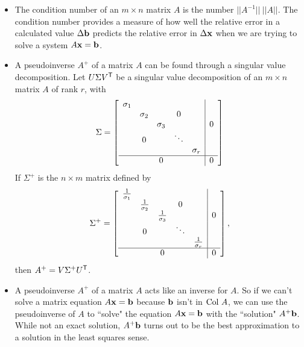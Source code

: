 \label{sec:pseudo_summ}
\begin{itemize}
\item The condition number of an $m \times n$ matrix $A$ is the number $||A^{-1}|| \ ||A||$. The condition number provides a measure of how well the relative error in a calculated value $\Delta \mathbf{b}$ predicts the relative error in $\Delta \mathbf{x}$ when we are trying to solve a system $A \mathbf{x} = \mathbf{b}$.  
\item A pseudoinverse $A^{+}$ of a matrix $A$ can be found through a singular value decomposition. Let $U \Sigma V^{\mathsf{T}}$ be a singular value decomposition of an $m \times n$ matrix $A$ of rank $r$, with
\[\Sigma = \left[ \begin{array}{ccccc|c} \sigma_1&&&&& \\ & \sigma_2&&0&& \\ && \sigma_3&&&0 \\ & 0 & & \ddots & & \\ &&&& \sigma_r \\ \hline &&0&&&0 \end{array} \right] \]
If $\Sigma^+$ is the $n \times m$ matrix defined by
\[\Sigma^{+} = \left[ \begin{array}{ccccc|c} \frac{1}{\sigma_1}&&&&& \\ & \frac{1}{\sigma_2}&&0&& \\ && \frac{1}{\sigma_3}&&&0 \\ & 0 & & \ddots & & \\ &&&& \frac{1}{\sigma_r} \\ \hline &&0&&&0 \end{array} \right],\]
then $A^{+} = V\Sigma^{+}U^{\mathsf{T}}$. 
\item A pseudoinverse $A^{+}$ of a matrix $A$ acts like an inverse for $A$. So if we can't solve a matrix equation $A \mathbf{x} = \mathbf{b}$ because $\mathbf{b}$ isn't in $\text{Col } A$, we can use the pseudoinverse of $A$ to ``solve" the equation $A \mathbf{x} = \mathbf{b}$ with the ``solution" $A^+ \mathbf{b}$. While not an exact solution, $A^+ \mathbf{b}$ turns out to be the best approximation to a solution in the least squares sense. 
\end{itemize}


